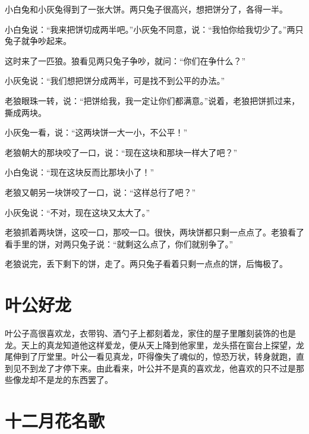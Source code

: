\documentclass[12pt,UTF-8,openany]{ctexbook}
\begin{document}
\begin{Large}
    
    小白兔和小灰兔得到了一张大饼。两只兔子很高兴，想把饼分了，各得一半。
    
    小白兔说：“我来把饼切成两半吧。”小灰兔不同意，说：“我怕你给我切少了。”两只兔子就争吵起来。
    
    这时来了一匹狼。狼看见两只兔子争吵，就问：“你们在争什么？”
    
    小灰兔说：“我们想把饼分成两半，可是找不到公平的办法。”
    
    老狼眼珠一转，说：“把饼给我，我一定让你们都满意。”说着，老狼把饼抓过来，撕成两块。
    
    小灰兔一看，说：“这两块饼一大一小，不公平！”
    
    老狼朝大的那块咬了一口，说：“现在这块和那块一样大了吧？”
    
    小白兔说：“现在这块反而比那块小了！”
    
    老狼又朝另一块饼咬了一口，说：“这样总行了吧？”
    
    小灰兔说：“不对，现在这块又太大了。”
    
    老狼抓着两块饼，这咬一口，那咬一口。很快，两块饼都只剩一点点了。老狼看了看手里的饼，对两只兔子说：“就剩这么点了，你们就别争了。”
    
    老狼说完，丢下剩下的饼，走了。两只兔子看着只剩一点点的饼，后悔极了。
    
\end{Large}

\chapter{叶公好龙}

\begin{Large}
    
    叶公子高很喜欢龙，衣带钩、酒勺子上都刻着龙，家住的屋子里雕刻装饰的也是龙。天上的真龙知道他这样爱龙，便从天上降到他家里，龙头搭在窗台上探望，龙尾伸到了厅堂里。叶公一看见真龙，吓得像失了魂似的，惊恐万状，转身就跑，直到见不到龙了才停下来。由此看来，叶公并不是真的喜欢龙，他喜欢的只不过是那些像龙却不是龙的东西罢了。
    
\end{Large}

\chapter{十二月花名歌}
\end{document}
